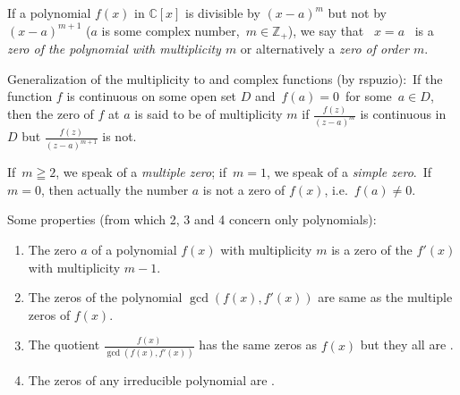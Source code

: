 \documentclass[12pt]{article}
\begin{document}
If a polynomial $f(x)$ in $\mathbb{C}[x]$ is divisible by $(x-a)^m$ but not by $(x-a)^{m+1}$ ($a$ is some complex number, \,$m \in \mathbb{Z}_+$), we say that \, $x = a$ \, is a\, {\em zero of the polynomial with multiplicity $m$} or alternatively a {\em zero of order $m$}.

Generalization of the multiplicity to  and complex functions (by rspuzio): \,If the function $f$ is continuous on some open set $D$ and \,$f(a) = 0$\, for some \,$a \in D$, then the zero of $f$ at $a$ is said to be of multiplicity $m$ if $\frac{f(z)}{(z\!-\!a)^m}$ is continuous in $D$ but $\frac{f(z)}{(z-a)^{m+1}}$ is not.

If\, $m \geqq 2$, we speak of a {\em multiple zero}; if\, $m = 1$, we speak of a {\em simple zero}.\, If\, $m = 0$, then actually the number $a$ is not a zero of $f(x)$, i.e.\, $f(a) \neq 0$. 

Some properties (from which 2, 3 and 4 concern only polynomials):
\begin{enumerate}

\item The zero $a$ of a polynomial $f(x)$ with multiplicity $m$ is a zero of the  $f'(x)$ with multiplicity $m\!-\!1$.
\item The zeros of the polynomial $\gcd(f(x), f'(x))$ are same as the multiple zeros of $f(x)$.
\item The quotient $\displaystyle\frac{f(x)}{\gcd(f(x), f'(x))}$ has the same zeros as $f(x)$ but they all are .
\item The zeros of any irreducible polynomial are .
\end{enumerate}
\end{document}
